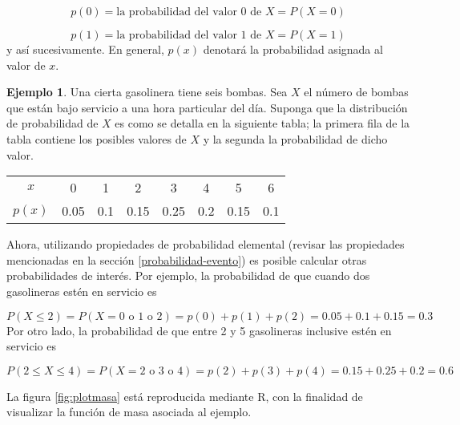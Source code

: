 \documentclass[
]{book}
\theoremstyle{definition}
\theoremstyle{definition}
\newtheorem{example}{Ejemplo}[chapter]
\theoremstyle{definition}
\theoremstyle{definition}
\theoremstyle{remark}
\begin{document}
\[p(0) = \text{la probabilidad del valor 0 de } X = P(X = 0)\]

\[p(1) = \text{la probabilidad del valor 1 de } X = P(X = 1)\]
y así sucesivamente. En general, \(p(x)\) denotará la probabilidad asignada al valor de \(x\).

\begin{example}
Una cierta gasolinera tiene seis bombas. Sea \(X\) el número de bombas que están bajo servicio a una hora particular del día. Suponga que la distribución de probabilidad de \(X\) es como se detalla en la siguiente tabla; la primera fila de la tabla contiene los posibles valores de \(X\) y la segunda la probabilidad de dicho valor.

\begin{table}[H]
\centering
\begin{tabular}{cccccccc}
\toprule
$x$ & 0 & 1 & 2 & 3 & 4 & 5 & 6\\
$p(x)$ & 0.05 & 0.1 & 0.15 & 0.25 & 0.2 & 0.15 & 0.1\\
\bottomrule
\end{tabular}
\end{table}

Ahora, utilizando propiedades de probabilidad elemental (revisar las propiedades mencionadas en la sección \ref{probabilidad-evento}) es posible calcular otras probabilidades de interés. Por ejemplo, la probabilidad de que cuando dos gasolineras estén en servicio es

\[P(X\leq 2) = P(X = 0 \text{ o } 1 \text{ o } 2) = p(0) + p(1) + p(2) = 0.05 + 0.1 + 0.15 = 0.3\]
Por otro lado, la probabilidad de que entre 2 y 5 gasolineras inclusive estén en servicio es

\[P(2\leq X\leq 4) = P(X = 2 \text{ o } 3 \text{ o } 4) = p(2) + p(3) + p(4) = 0.15 + 0.25 + 0.2 = 0.6\]
\end{example}

La figura \ref{fig:plotmasa} está reproducida mediante R, con la finalidad de visualizar la función de masa asociada al ejemplo.
\end{document}
